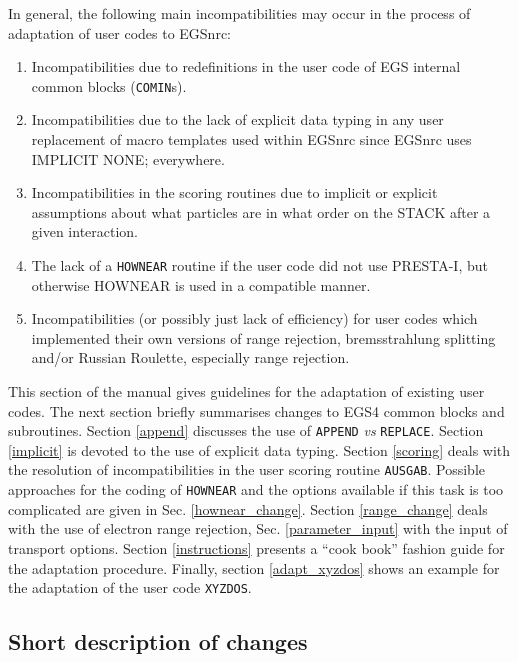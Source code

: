 In general, the following main incompatibilities may occur 
in the process of adaptation of user codes to EGSnrc:

\begin{enumerate}

\item
Incompatibilities due to redefinitions in the user code of EGS internal
common blocks (\verb+COMIN+s).

\item
Incompatibilities due to the lack of explicit data typing in any user
replacement of macro templates used within EGSnrc since EGSnrc uses
IMPLICIT NONE; everywhere.

\item
Incompatibilities in the scoring routines due to implicit or explicit 
assumptions about what particles are in what order on the STACK after a
given interaction.

\item The lack of a {\tt HOWNEAR} routine if the user code did not use
PRESTA-I, but otherwise HOWNEAR is used in a compatible manner.

\item
Incompatibilities (or possibly just lack of efficiency) for user codes
which implemented their own versions of range rejection, bremsstrahlung
splitting and/or Russian Roulette, especially range rejection.
\end{enumerate}

This section of the manual gives guidelines for the adaptation 
of existing user codes. The next section  
briefly summarises changes to EGS4 common blocks and 
subroutines. Section \ref{append} discusses the use of 
{\tt APPEND} {\em vs} {\tt REPLACE}. Section 
\ref{implicit} is devoted to the use of explicit data typing. 
Section \ref{scoring} deals with the resolution of 
incompatibilities in the user scoring routine 
{\tt AUSGAB}. Possible approaches for the 
coding of {\tt HOWNEAR} and the options available 
if this task is too complicated are given in Sec. \ref{hownear_change}. 
Section \ref{range_change} deals with the use of electron range rejection, 
Sec. \ref{parameter_input} with the input of transport options. 
Section \ref{instructions} presents a ``cook book'' fashion guide 
for the adaptation procedure. Finally, section 
\ref{adapt_xyzdos} shows an example for the adaptation of the user 
code {\tt XYZDOS}. 
 
\subsection{Short description of changes}
\label{changes}

